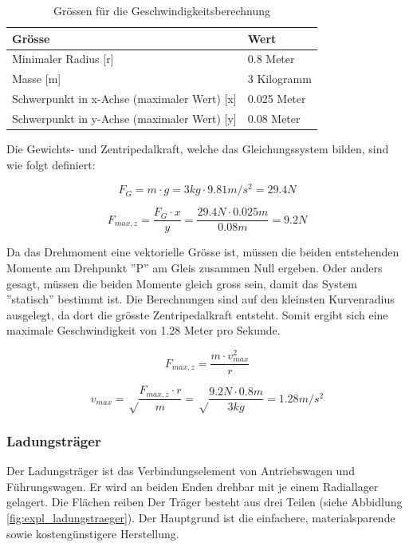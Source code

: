 \documentclass[../../main.tex]{subfiles}
\begin{document}
    \begin{table}[H] \centering
        \begin{tabular}{|l|l|}
        \hline
        \textbf{Grösse} & \textbf{Wert}\\
        \hline
        Minimaler Radius  [r]                               & 0.8 Meter\\
         \hline
        Masse [m]                                           & 3 Kilogramm\\
        \hline
        Schwerpunkt in x-Achse (maximaler Wert) [x]         & 0.025 Meter\\
        \hline
        Schwerpunkt in y-Achse (maximaler Wert) [y]         & 0.08 Meter\\
        \hline
        \end{tabular}

        \caption{Grössen für die Geschwindigkeitsberechnung}
        \label{tab:geschwindigkeitsberechnung}
        \end{table}

    Die Gewichts- und Zentripedalkraft, welche das Gleichungssystem bilden, sind wie folgt definiert:

    $$F_{G}=m \cdot g=3kg \cdot 9.81m/s^2=29.4N$$

    $$F_{max, z}=\frac{F_{G} \cdot x}{y}=\frac{29.4N \cdot 0.025m}{0.08m}=9.2N$$
    \newpage

    Da das Drehmoment eine vektorielle Grösse ist, müssen die beiden entstehenden Momente am Drehpunkt ''P'' am Gleis zusammen Null ergeben. Oder anders gesagt, müssen die beiden Momente gleich gross sein, damit das System ''statisch'' bestimmt ist. Die Berechnungen sind auf den kleinsten Kurvenradius ausgelegt, da dort die grösste Zentripedalkraft entsteht. Somit ergibt sich eine maximale Geschwindigkeit von 1.28 Meter pro Sekunde.

    $$F_{max, z}=\frac{m \cdot v_{max}^2}{r}$$

    $$v_{max}=\sqrt\frac{F_{max, z}\cdot r}{m}=\sqrt\frac{9.2N \cdot 0.8m}{3kg}=1.28m/s^2$$

    \subsubsection{Ladungsträger}
    Der Ladungsträger ist das Verbindungselement von Antriebswagen und Führungswagen. Er wird an beiden Enden drehbar mit je einem Radiallager gelagert. Die Flächen reiben Der Träger besteht aus drei Teilen (siehe Abbidlung \ref{fig:expl_ladungstraeger}). Der Hauptgrund ist die einfachere, materialsparende sowie kostengünstigere Herstellung.\\
\end{document}
